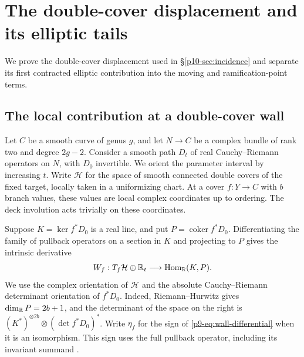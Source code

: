 \section{The double-cover displacement and its elliptic tails}\label{sec:smooth-crossings}
We prove the double-cover displacement used in \S\ref{p10-sec:incidence} and separate its first contracted elliptic contribution into the moving and ramification-point terms.
\subsection{The local contribution at a double-cover wall}\label{p9-sec:wall}

Let $C$ be a smooth curve of genus $g$, and let $N\to C$ be a complex
bundle of rank two and degree $2g-2$. Consider a smooth path $D_t$ of
real Cauchy--Riemann operators on $N$, with $D_0$ invertible. We orient
the parameter interval by increasing $t$. Write $\mathcal H$ for the
space of smooth connected double covers of the fixed target, locally
taken in a uniformizing chart. At a cover $f:Y\to C$ with $b$ branch
values, these values are local complex coordinates up to ordering.
The deck involution acts trivially on these coordinates.

Suppose $K=\ker f^*D_0$ is a real line, and put $P=\operatorname{coker}
f^*D_0$. Differentiating the family of pullback operators on a section
in $K$ and projecting to $P$ gives the intrinsic derivative
\begin{equation}\label{p9-eq:wall-differential}
 W_f:T_f\mathcal H\oplus\mathbb R_t\longrightarrow
                  \operatorname{Hom}_{\mathbb R}(K,P).
\end{equation}
We use the complex orientation of $\mathcal H$ and the absolute
Cauchy--Riemann determinant orientation of $f^*D_0$. Indeed,
Riemann--Hurwitz gives $\dim_{\mathbb R}P=2b+1$, and the determinant of the
space on the right is $(K^*)^{\otimes 2b}\otimes(\det f^*D_0)^*$.
Write $\eta_f$ for the sign of \eqref{p9-eq:wall-differential} when it is an
isomorphism. This sign uses the full pullback operator, including its
invariant summand \cite[(4.59) and (5.59)--(5.60)]{bai}.

